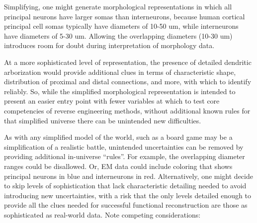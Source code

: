 \documentclass{ldr-article}
\begin{document}
Simplifying, one might generate morphological representations in which all principal neurons have larger somas than interneurons, because human cortical principal cell somas typically have diameters of 10-50 um, while interneurons have diameters of 5-30 um. Allowing the overlapping diameters (10-30 um) introduces room for doubt during interpretation of morphology data.

At a more sophisticated level of representation, the presence of detailed dendritic arborization would provide additional clues in terms of characteristic shape, distribution of proximal and distal connections, and more, with which to identify reliably. So, while the simplified morphological representation is intended to present an easier entry point with fewer variables at which to test core competencies of reverse engineering methods, without additional known rules for that simplified universe there can be unintended new difficulties.

As with any simplified model of the world, such as a board game may be a simplification of a realistic battle, unintended uncertainties can be removed by providing additional in-universe ``rules''. For example, the overlapping diameter ranges could be disallowed. Or, EM data could include coloring that shows principal neurons in blue and interneurons in red. Alternatively, one might decide to skip levels of sophistication that lack characteristic detailing needed to avoid introducing new uncertainties, with a risk that the only levels detailed enough to provide all the clues needed for successful functional reconstruction are those as sophisticated as real-world data. Note competing considerations:
\end{document}
